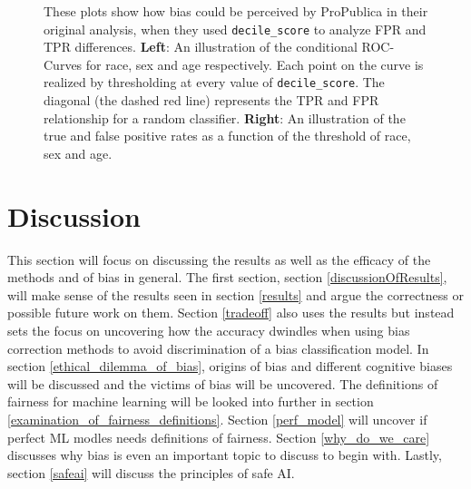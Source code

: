 \documentclass[11pt, fleqn, titlepage]{article}
\begin{document}
\begin{figure}[H]
\begin{subfigure}{0.5\textwidth}
		\end{subfigure}
		\caption{These plots show how bias could be perceived by ProPublica in their original analysis, when they used \texttt{decile\_score} to analyze FPR and TPR differences. \textbf{Left}: An illustration of the conditional ROC-Curves for race, sex and age respectively. Each point on the curve is realized by thresholding at every value of \texttt{decile\_score}. The diagonal (the dashed red line) represents the TPR and FPR relationship for a random classifier. \textbf{Right}: An illustration of the true and false positive rates as a function of the threshold of race, sex and age.}
	\end{figure}
	
	\section{Discussion} \label{discussion}	
	This section will focus on discussing the results as well as the efficacy of the methods and of bias in general. The first section, section \ref{discussionOfResults}, will make sense of the results seen in section \ref{results} and argue the correctness or possible future work on them. Section \ref{tradeoff} also uses the results but instead sets the focus on uncovering how the accuracy dwindles when using bias correction methods to avoid discrimination of a bias classification model. In section \ref{ethical_dilemma_of_bias}, origins of bias and different cognitive biases will be discussed and the victims of bias will be uncovered. The definitions of fairness for machine learning will be looked into further in section \ref{examination_of_fairness_definitions}. Section \ref{perf_model} will uncover if perfect ML modles needs definitions of fairness. Section \ref{why_do_we_care} discusses why bias is even an important topic to discuss to begin with. Lastly, section \ref{safeai} will discuss the principles of safe AI.
	
\end{document}
